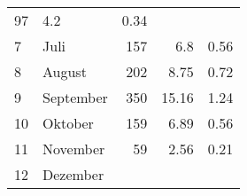 \begin{longtable}{lXrrr}
       \num{97} &
       \num[round-mode=places,round-precision=2]{4.2} &
         \num[round-mode=places,round-precision=2]{0.34} \\

     7 &
     \multicolumn{1}{X}{ Juli   } &


       \num{157} &
       \num[round-mode=places,round-precision=2]{6.8} &
         \num[round-mode=places,round-precision=2]{0.56} \\

     8 &
     \multicolumn{1}{X}{ August   } &


       \num{202} &
       \num[round-mode=places,round-precision=2]{8.75} &
         \num[round-mode=places,round-precision=2]{0.72} \\

     9 &
     \multicolumn{1}{X}{ September   } &


       \num{350} &
       \num[round-mode=places,round-precision=2]{15.16} &
         \num[round-mode=places,round-precision=2]{1.24} \\

     10 &
     \multicolumn{1}{X}{ Oktober   } &


       \num{159} &
       \num[round-mode=places,round-precision=2]{6.89} &
         \num[round-mode=places,round-precision=2]{0.56} \\

     11 &
     \multicolumn{1}{X}{ November   } &


       \num{59} &
       \num[round-mode=places,round-precision=2]{2.56} &
         \num[round-mode=places,round-precision=2]{0.21} \\

     12 &
     \multicolumn{1}{X}{ Dezember   } &



\end{longtable}
